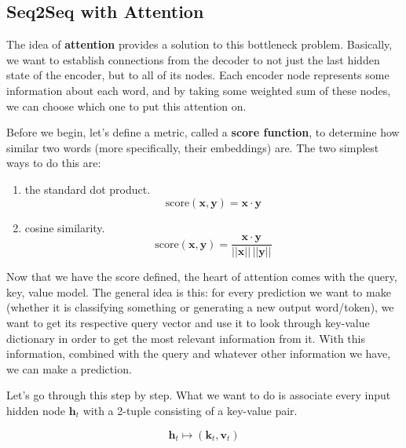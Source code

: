 \subsection{Seq2Seq with Attention}

  The idea of \textbf{attention} provides a solution to this bottleneck problem. Basically, we want to establish connections from the decoder to not just the last hidden state of the encoder, but to all of its nodes. Each encoder node represents some information about each word, and by taking some weighted sum of these nodes, we can choose which one to put this attention on. 

  \begin{definition}
    Before we begin, let's define a metric, called a \textbf{score function}, to determine how similar two words (more specifically, their embeddings) are. The two simplest ways to do this are: 
    \begin{enumerate}
      \item the standard dot product. 
        \begin{equation}
          \mathrm{score}(\mathbf{x}, \mathbf{y}) = \mathbf{x} \cdot \mathbf{y} 
        \end{equation}
      \item cosine similarity. 
        \begin{equation}
          \mathrm{score}(\mathbf{x}, \mathbf{y}) = \frac{\mathbf{x} \cdot \mathbf{y}}{||\mathbf{x}|| \, ||\mathbf{y}||}
        \end{equation}
    \end{enumerate}
  \end{definition}

  Now that we have the score defined, the heart of attention comes with the query, key, value model. The general idea is this: for every prediction we want to make (whether it is classifying something or generating a new output word/token), we want to get its respective query vector and use it to look through key-value dictionary in order to get the most relevant information from it. With this information, combined with the query and whatever other information we have, we can make a prediction. 

  Let's go through this step by step. What we want to do is associate every input hidden node $\mathbf{h}_t$ with a 2-tuple consisting of a key-value pair. 

  \begin{equation}
    \mathbf{h}_t \mapsto (\mathbf{k}_t, \mathbf{v}_t)
  \end{equation}

